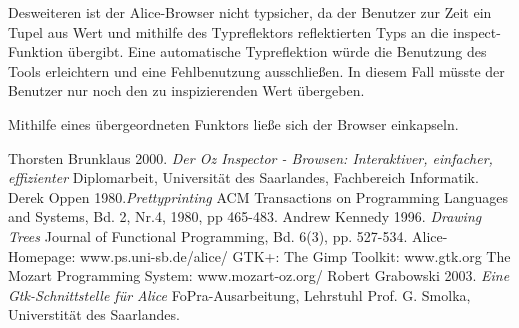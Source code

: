 \documentclass[12pt,a4paper]{article}
\begin{document}
Desweiteren ist der Alice-Browser nicht typsicher, 
da der Benutzer zur Zeit ein Tupel aus 
Wert und mithilfe des Typreflektors reflektierten Typs 
an die inspect-Funktion \"ubergibt.  
Eine automatische Typreflektion w\"urde die Benutzung des Tools 
erleichtern und eine Fehlbenutzung ausschlie\ss en. 
In diesem Fall m\"usste der Benutzer nur noch den zu 
inspizierenden Wert \"ubergeben. 

Mithilfe eines \"ubergeordneten Funktors lie\ss e 
sich der Browser einkapseln.


\begin{thebibliography}{99}

 Thorsten Brunklaus 2000. {\em Der Oz Inspector - Browsen: 
    Interaktiver, einfacher, effizienter} Diplomarbeit, Universit\"{a}t 
    des Saarlandes, Fachbereich Informatik.
 Derek Oppen 1980.{\em Prettyprinting} ACM Transactions 
  on Programming Languages and Systems, Bd. 2, Nr.4, 1980, pp 465-483.
 Andrew Kennedy 1996. {\em Drawing Trees} 
                Journal of Functional Programming, Bd. 6(3), pp. 527-534.
 Alice-Homepage: www.ps.uni-sb.de/alice/
 GTK+: The Gimp Toolkit: www.gtk.org 
 The Mozart Programming System: www.mozart-oz.org/
 Robert Grabowski 2003. {\em Eine Gtk-Schnittstelle f\"ur 
                Alice} 
                FoPra-Ausarbeitung, Lehrstuhl Prof. G. Smolka, 
                Universtit\"at des Saarlandes.

\end{thebibliography}
\end{document}
